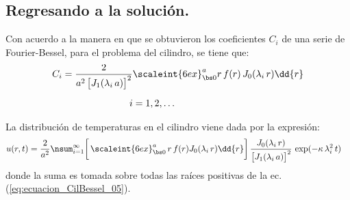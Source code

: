 \subsection{Regresando a la solución.}

Con acuerdo a la manera en que se obtuvieron los coeficientes $C_{i}$ de una serie de Fourier-Bessel, para el problema del cilindro, se tiene que:
\begin{align}
\begin{aligned}
C_{i} = \dfrac{2}{a^{2} \, \big[ J_{1} (\lambda_{i} \, a) \big]^{2}} &\scaleint{6ex}_{\bs 0}^{a} r \, f(r) \, J_{0}(\lambda_{i} \, r) \dd{r} \\[0.5em]
i &= 1, 2, \ldots
\end{aligned}
\label{eq:ecuacion_Cil_Bessel_09}
\end{align}

La distribución de temperaturas en el cilindro viene dada por la expresión:
\begin{eqnarray}
\begin{aligned}[b]
u(r, t) &= \dfrac{2}{a^{2}} \nsum_{i=1}^{\infty} \bigg[ \, \scaleint{6ex}_{\bs 0}^{a} \, r \, f(r) J_{0} (\lambda_{i} \, r) \dd{r} \bigg] \, \dfrac{J_{0} (\lambda_{i} \, r)}{\big[ J_{1} (\lambda_{i} \, a) \big]^{2}} \, \exp( -\kappa \, \lambda_{i}^{2} \, t)
\end{aligned}
\label{eq:ecuacion_CilBessel10}
\end{eqnarray}
donde la suma es tomada sobre todas las raíces positivas de la ec. (\ref{eq:ecuacion_CilBessel_05}).
